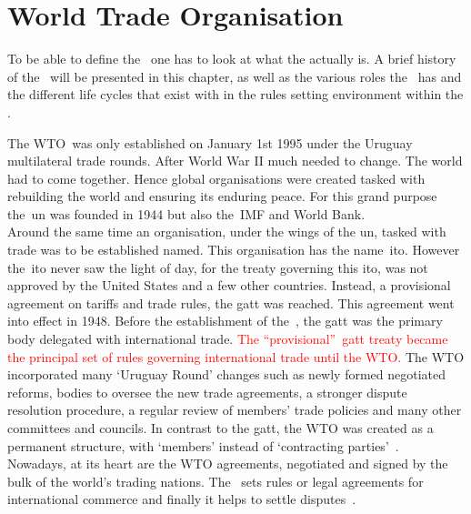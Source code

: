 \section{World Trade Organisation}


To be able to define the \wto~one has to look at what the  actually is.
A brief history of the \wto~will be presented in this chapter, as well as the various roles the \wto~has and the different life cycles that exist with in the rules setting environment within the \wto.

The \gls{WTO}~was only established on January 1st 1995 under the Uruguay multilateral trade rounds.
After World War II much needed to change. 
The world had to come together. 
Hence global organisations were created tasked with rebuilding the world and ensuring its enduring peace. 
For this grand purpose the~\gls{un} was founded in 1944 but also the~\gls{IMF} and World Bank.\\
Around the same time an organisation, under the wings of the \gls{un}, tasked with trade was to be established named. 
This organisation has the name~\gls{ito}. 
However the~\gls{ito} never saw the light of day, for the treaty governing this \gls{ito}, was not approved by the United States and a few other countries. 
Instead, a provisional agreement on tariffs and trade rules, the \gls{gatt} was reached. 
This agreement went into effect in 1948.
Before the establishment of the~\wto, the \gls{gatt} was the primary body delegated with international trade. 
\textcolor{red}{The ``provisional''~\gls{gatt} treaty became the principal set of rules governing international trade until the \gls{WTO}.}%
The \gls{WTO} incorporated many `Uruguay Round' changes such as newly formed negotiated reforms, bodies to oversee the new trade agreements, a stronger dispute resolution procedure, a regular review of members’ trade policies and many other committees and councils. 
In contrast to the \gls{gatt}, the \gls{WTO} was created as a permanent structure, with `members' instead of `contracting parties'~\cite{Fergusson:2007ws}.\\
Nowadays, at its heart are the WTO agreements, negotiated and signed by the bulk of the world’s trading nations. 
The \wto~sets rules or legal agreements for international commerce and finally it helps to settle disputes~\cite{WTO:2012}.



